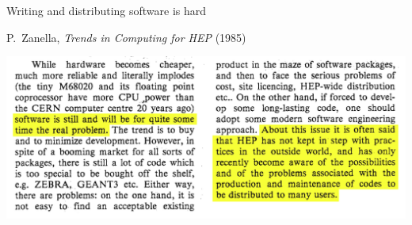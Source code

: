 \documentclass[aspectratio=169]{beamer}
\begin{document}
\begin{frame}{Writing and distributing software is hard}
\vspace{0.25 cm}
\begin{center}
\begin{minipage}{0.8\linewidth}
\begin{center}
P.\ Zanella, {\it Trends in Computing for HEP} (1985)
\end{center}
\end{minipage}

\vspace{0.25 cm}
\includegraphics[width=0.9\linewidth]{PLOTS/zanella-trends-in-computing-for-hep.png}
\end{center}
\end{frame}
\end{document}
